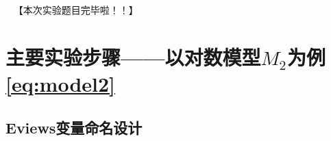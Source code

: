 \documentclass[12pt,(landscape,a4paper),(portrait,a4paper)]{article}
\let\stdsection\section
\renewcommand\section{\newpage\stdsection}
\begin{document}
~ 【本次实验题目完毕啦！！】

\newpage

\hypertarget{m_2refeqmodel2}{%
\section{\texorpdfstring{主要实验步骤------以对数模型\(M_2\)为例\eqref{eq:model2}}{主要实验步骤------以对数模型M\_2为例\eqref{eq:model2}}}\label{m_2refeqmodel2}}

\hypertarget{eviews}{%
\subsection{Eviews变量命名设计}\label{eviews}}

~

\begin{table}


\end{table}
\end{document}
